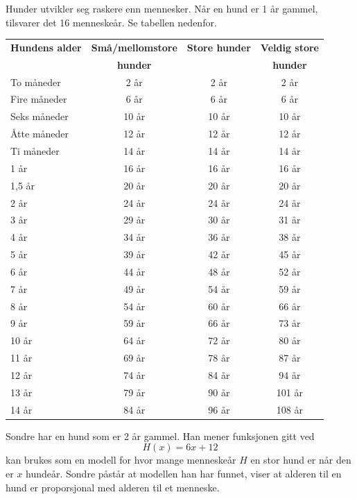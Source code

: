 \newpage
{}
Hunder utvikler seg raskere enn mennesker. Når en hund er 1 år gammel, tilsvarer
det 16 menneskeår. Se tabellen nedenfor.
\begin{center}
	\small
	\begin{tabular}{l c c c}
		\hline
		\rowcolor{gray!20} \textbf{Hundens alder} & \textbf{Små/mellomstore} & \textbf{Store hunder} & \textbf{Veldig store} \\
		\rowcolor{gray!20} & \textbf{hunder} & & \textbf{hunder} \\
		\hline
		To måneder   & 2 år   & 2 år   & 2 år  \\
		\rowcolor{gray!20} Fire måneder & 6 år   & 6 år   & 6 år  \\
		Seks måneder & 10 år  & 10 år  & 10 år \\
		\rowcolor{gray!20} Åtte måneder & 12 år  & 12 år  & 12 år \\
		Ti måneder   & 14 år  & 14 år  & 14 år \\
		\rowcolor{gray!20} 1 år         & 16 år  & 16 år  & 16 år \\
		1,5 år       & 20 år  & 20 år  & 20 år \\
		\rowcolor{gray!20} 2 år         & 24 år  & 24 år  & 24 år \\
		3 år         & 29 år  & 30 år  & 31 år \\
		\rowcolor{gray!20} 4 år         & 34 år  & 36 år  & 38 år \\
		5 år         & 39 år  & 42 år  & 45 år \\
		\rowcolor{gray!20} 6 år         & 44 år  & 48 år  & 52 år \\
		7 år         & 49 år  & 54 år  & 59 år \\
		\rowcolor{gray!20} 8 år         & 54 år  & 60 år  & 66 år \\
		9 år         & 59 år  & 66 år  & 73 år \\
		\rowcolor{gray!20} 10 år        & 64 år  & 72 år  & 80 år \\
		11 år        & 69 år  & 78 år  & 87 år \\
		\rowcolor{gray!20} 12 år        & 74 år  & 84 år  & 94 år \\
		13 år        & 79 år  & 90 år  & 101 år \\
		\rowcolor{gray!20} 14 år        & 84 år  & 96 år  & 108 år \\
		\hline
	\end{tabular}
\end{center}
Sondre har en hund som er 2 år gammel. Han mener funksjonen gitt ved
\[ H(x)=6x+12 \]
kan brukes som en modell for hvor mange menneskeår $H$ en stor hund er når den
er $x$ hundeår.
Sondre påstår at modellen han har funnet, viser at alderen til en hund er proporsjonal med alderen til et menneske.

